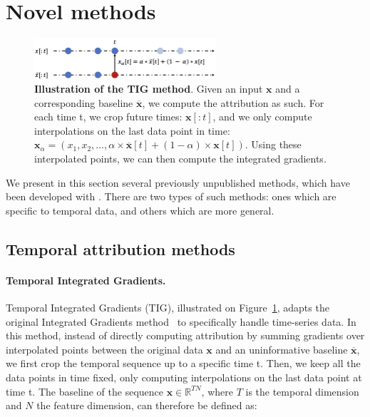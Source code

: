 \section{Novel methods}
\label{sec:methods}

\begin{figure}[t]
\begin{center}
\centerline{\includegraphics[width=0.6\textwidth]{figures/tig}}
\caption{
    \textbf{Illustration of the TIG method}.
    Given an input $\textbf{x}$ and a corresponding baseline $\overline{\textbf{x}}$, we compute the attribution as such.
    For each time t, we crop future times: $\textbf{x}[:t]$, and we only compute interpolations on the last data point in
    time: $\textbf{x}_{\alpha} = (x_1, x_2, \dots, \alpha \times \overline{\textbf{x}}[t] + (1 - \alpha) \times \textbf{x}[t])$.
    Using these interpolated points, we can then compute the integrated gradients.
}
\label{fig:tig}
\end{center}
\end{figure}

We present in this section several previously unpublished methods, which have been developed
with \texttt{}.
There are two types of such methods: ones which are specific to temporal data, and others which are more general.


\subsection{Temporal attribution methods}
\label{subsec:temporal-attribution-methods}

\paragraph{Temporal Integrated Gradients.}

Temporal Integrated Gradients (TIG), illustrated on Figure~\ref{fig:tig}, adapts the original Integrated Gradients
method~\citep{sundararajan2017axiomatic} to specifically handle time-series data.
In this method, instead of directly computing attribution by summing gradients over interpolated points between the
original data $\textbf{x}$ and an uninformative baseline $\overline{\textbf{x}}$, we first crop the temporal sequence up
to a specific time t.
Then, we keep all the data points in time fixed, only computing interpolations on the last data point at time t.
The baseline of the sequence $\textbf{x} \in \mathbb{R}^{TN}$, where $T$ is the temporal dimension and $N$ the
feature dimension, can therefore be defined as:

